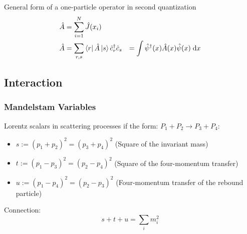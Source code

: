 			\noindent
			General form of a one-particle operator in second quantization
			\begin{equation}
				\begin{aligned}
					\hat{A} &= \sum_{i=1}^N \hat{J}(x_i) \\
					\hat{A} &= \sum_{r,s} \Bra{r}\hat{A}\Ket{s} \hat{c}_r^\dagger \hat{c}_s
					&= \int \hat{\psi}^\dagger(x) \hat{A}(x) \hat{\psi}(x) \; \dd x
				\end{aligned}
			\end{equation}

	\subsection{Interaction}
		\subsubsection{Mandelstam Variables}
			\noindent
			Lorentz scalars in scattering processes if the form: $P_1 + P_2 \rightarrow P_3 + P_4$:
			\begin{itemize}\itemsep -0pt	%
				\item $s:=(p_1+p_2)^2=(p_3+p_4)^2$ \hfill{(Square of the invariant mass)}
				\item $t:=(p_1-p_3)^2=(p_2-p_4)^2$ \hfill{(Square of the four-momentum transfer)}
				\item $u:=(p_1-p_4)^2=(p_2-p_3)^2$ \hfill{(Four-momentum transfer of the rebound particle)}
			\end{itemize}

			\noindent
			Connection:
			\begin{equation}
				s+t+u = \sum_i m_i^2
			\end{equation}

